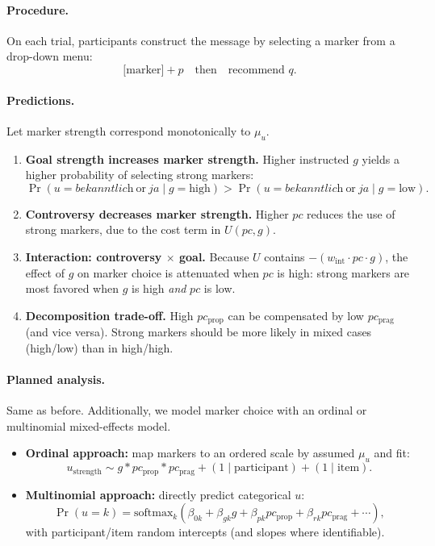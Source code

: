\documentclass[12pt]{article}
\begin{document}
\paragraph{Procedure.}
On each trial, participants construct the message by selecting a marker from a drop-down menu:
\[
\text{[marker]} + p \quad\text{then}\quad \text{recommend } q.
\]

\paragraph{Predictions.}
Let marker strength correspond monotonically to $\mu_u$.
\begin{enumerate}
\item \textbf{Goal strength increases marker strength.}
Higher instructed $g$ yields a higher probability of selecting strong markers:
\[
\Pr(u=\textit{bekanntlich}\ \text{or}\ \textit{ja} \mid g=\text{high})
>
\Pr(u=\textit{bekanntlich}\ \text{or}\ \textit{ja} \mid g=\text{low}).
\]
\item \textbf{Controversy decreases marker strength.}
Higher $pc$ reduces the use of strong markers, due to the cost term in $U(pc,g)$.
\item \textbf{Interaction: controversy $\times$ goal.}
Because $U$ contains $-(w_{\mathrm{int}} \cdot pc\cdot g)$, the effect of $g$ on marker choice is attenuated when $pc$ is high: strong markers are most favored when $g$ is high \emph{and} $pc$ is low.
\item \textbf{Decomposition trade-off.}
High $pc_{\text{prop}}$ can be compensated by low $pc_{\text{prag}}$ (and vice versa). Strong markers should be more likely in mixed cases (high/low) than in high/high.
\end{enumerate}

\paragraph{Planned analysis.} Same as before. Additionally, we model marker choice with an ordinal or multinomial mixed-effects model.
\begin{itemize}
\item \textbf{Ordinal approach:} map markers to an ordered scale by assumed $\mu_u$ and fit:
\[
u_{\text{strength}} \sim g * pc_{\text{prop}} * pc_{\text{prag}} + (1\mid \text{participant}) + (1\mid \text{item}).
\]
\item \textbf{Multinomial approach:} directly predict categorical $u$:
\[
\Pr(u=k) = \mathrm{softmax}_k(\beta_{0k} + \beta_{gk} g + \beta_{pk} pc_{\text{prop}} + \beta_{rk} pc_{\text{prag}} + \cdots),
\]
with participant/item random intercepts (and slopes where identifiable).
\end{itemize}
\end{document}
